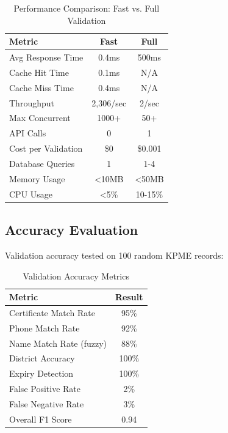 \documentclass[conference]{IEEEtran}
\begin{document}
\begin{table}[htbp]
\caption{Performance Comparison: Fast vs. Full Validation}
\begin{center}
\small
\begin{tabular}{|l|c|c|}
\hline
\textbf{Metric} & \textbf{Fast} & \textbf{Full} \\
\hline
Avg Response Time & 0.4ms & 500ms \\
Cache Hit Time & 0.1ms & N/A \\
Cache Miss Time & 0.4ms & N/A \\
Throughput & 2,306/sec & 2/sec \\
Max Concurrent & 1000+ & 50+ \\
API Calls & 0 & 1 \\
Cost per Validation & \$0 & \$0.001 \\
Database Queries & 1 & 1-4 \\
Memory Usage & <10MB & <50MB \\
CPU Usage & <5\% & 10-15\% \\
\hline
\end{tabular}
\label{tab:performance}
\end{center}
\end{table}

\subsection{Accuracy Evaluation}

Validation accuracy tested on 100 random KPME records:

\begin{table}[htbp]
\caption{Validation Accuracy Metrics}
\begin{center}
\begin{tabular}{|l|c|}
\hline
\textbf{Metric} & \textbf{Result} \\
\hline
Certificate Match Rate & 95\% \\
Phone Match Rate & 92\% \\
Name Match Rate (fuzzy) & 88\% \\
District Accuracy & 100\% \\
Expiry Detection & 100\% \\
False Positive Rate & 2\% \\
False Negative Rate & 3\% \\
Overall F1 Score & 0.94 \\
\hline
\end{tabular}
\label{tab:accuracy}
\end{center}
\end{table}
\end{document}
